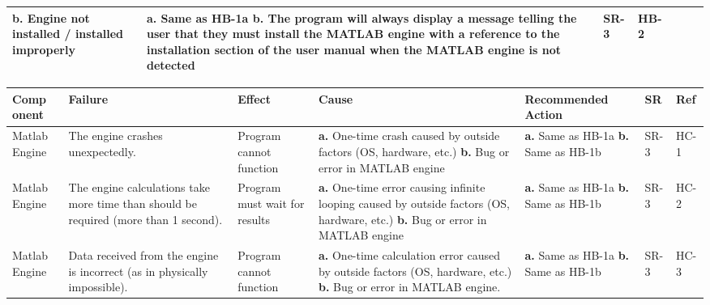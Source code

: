 \documentclass{article}
\begin{document}
\begin{landscape}
\begin{table}[H]
\begin{tabular}{|p{} | p{} | p{} | p{} | p{} | p{} | p{}|}
        \textbf{b.} Engine not installed / installed improperly 
      & \textbf{a.} Same as HB-1a\newline
        \textbf{b.} The program will always display a message telling the user that they must install the MATLAB engine with a reference 
        to the installation section of the user manual when the MATLAB engine is not detected 
      &SR-3 & HB-2\\
    \bottomrule
      \end{tabular}
      \end{table}
      \pagebreak
      \begin{table}[H]
    \begin{tabular}{|p{} | p{} | p{} | p{} | p{} | p{} | p{}|}
          \toprule
          \textbf{Comp onent} & \textbf{Failure} & \textbf{Effect} & \textbf{Cause} & \textbf{Recommended Action} & \textbf{SR} & \textbf{Ref}\\
      \midrule
      Matlab Engine& The engine crashes unexpectedly.
      & Program cannot function
      & \textbf{a.} One-time crash caused by outside factors (OS, hardware, etc.)\newline
        \textbf{b.} Bug or error in MATLAB engine    
      & \textbf{a.} Same as HB-1a\newline
        \textbf{b.} Same as HB-1b 
      &SR-3&HC-1\\
      \midrule
      Matlab Engine& The engine calculations take more time than should be required (more than 1 second).
      & Program must wait for results
      & \textbf{a.} One-time error causing infinite looping caused by outside factors (OS, hardware, etc.)\newline
        \textbf{b.} Bug or error in MATLAB engine   
      & \textbf{a.} Same as HB-1a\newline
        \textbf{b.} Same as HB-1b 
      &SR-3&HC-2\\
      \midrule
      Matlab Engine& Data received from the engine is incorrect (as in physically impossible).
      & Program cannot function
      & \textbf{a.} One-time calculation error caused by outside factors (OS, hardware, etc.)\newline
        \textbf{b.} Bug or error in MATLAB engine.  
      & \textbf{a.} Same as HB-1a\newline
        \textbf{b.} Same as HB-1b 
      &SR-3&HC-3\\
      \bottomrule
        \end{tabular}

\end{table}
\end{landscape}
\end{document}
